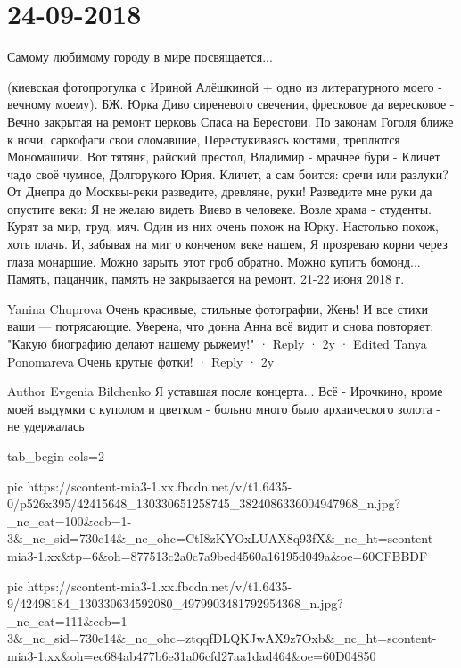  
 
 
 
 
\section{24-09-2018}

Самому любимому городу в мире посвящается...

(киевская фотопрогулка с Ириной Алёшкиной + одно из литературного моего - вечному моему).
БЖ. Юрка
Диво сиреневого свечения, фресковое да вересковое -
Вечно закрытая на ремонт церковь Спаса на Берестови.
По законам Гоголя ближе к ночи, саркофаги свои сломавшие,
Перестукиваясь костями, треплются Мономашичи.
Вот тятяня, райский престол, Владимир - мрачнее бури -
Кличет чадо своё чумное, Долгорукого Юрия.
Кличет, а сам боится: сречи или разлуки?
От Днепра до Москвы-реки разведите, древляне, руки!
Разведите мне руки да опустите веки:
Я не желаю видеть Виево в человеке.
Возле храма - студенты. Курят за мир, труд, мяч.
Один из них очень похож на Юрку. 
Настолько похож, хоть плачь.
И, забывая на миг о конченом веке нашем,
Я прозреваю корни через глаза монаршие.
Можно зарыть этот гроб обратно. Можно купить бомонд...
Память, пацанчик, память не закрывается на ремонт.
21-22 июня 2018 г.

Yanina Chuprova
Очень красивые, стильные фотографии, Жень! И все стихи ваши — потрясающие. Уверена, что донна Анна всё видит и снова повторяет: "Какую биографию делают нашему рыжему!"
 · Reply · 2y · Edited
Tanya Ponomareva
Очень крутые фотки!
 · Reply · 2y

Author
Evgenia Bilchenko
Я уставшая после концерта... Всё - Ирочкино, кроме моей выдумки с куполом и цветком - больно много было архаического золота - не удержалась


\ifcmt
  tab_begin cols=2

     pic https://scontent-mia3-1.xx.fbcdn.net/v/t1.6435-0/p526x395/42415648_130330651258745_3824086336004947968_n.jpg?_nc_cat=100&ccb=1-3&_nc_sid=730e14&_nc_ohc=CtI8zKYOxLUAX8q93fX&_nc_ht=scontent-mia3-1.xx&tp=6&oh=877513c2a0c7a9bed4560a16195d049a&oe=60CFBBDF

     pic https://scontent-mia3-1.xx.fbcdn.net/v/t1.6435-9/42498184_130330634592080_4979903481792954368_n.jpg?_nc_cat=111&ccb=1-3&_nc_sid=730e14&_nc_ohc=ztqqfDLQKJwAX9z7Oxb&_nc_ht=scontent-mia3-1.xx&oh=ec684ab477b6e31a06cfd27aa1dad464&oe=60D04850

